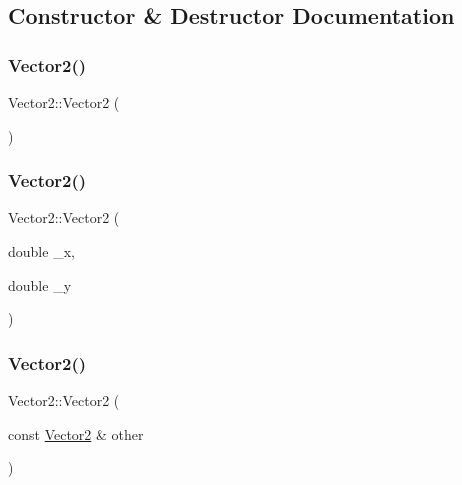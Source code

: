 \subsection{Constructor \& Destructor Documentation}
\mbox{\label{struct_vector2_a22104d1809be26a419ef1f959e3761bf}} 
\subsubsection{\texorpdfstring{Vector2()}{Vector2()}\hspace{0.1cm}{\footnotesize\ttfamily [1/3]}}
{\footnotesize\ttfamily Vector2\+::\+Vector2 (\begin{DoxyParamCaption}{ }\end{DoxyParamCaption})}

\mbox{\label{struct_vector2_a861062b13bd0e92d50b3ffd90c9edd77}} 
\subsubsection{\texorpdfstring{Vector2()}{Vector2()}\hspace{0.1cm}{\footnotesize\ttfamily [2/3]}}
{\footnotesize\ttfamily Vector2\+::\+Vector2 (\begin{DoxyParamCaption}\item[{double}]{\+\_\+x,  }\item[{double}]{\+\_\+y }\end{DoxyParamCaption})}

\mbox{\label{struct_vector2_ac0c70e89b089fb619dae62c32ccde4ec}} 
\subsubsection{\texorpdfstring{Vector2()}{Vector2()}\hspace{0.1cm}{\footnotesize\ttfamily [3/3]}}
{\footnotesize\ttfamily Vector2\+::\+Vector2 (\begin{DoxyParamCaption}\item[{const \mbox{\hyperlink{struct_vector2}{Vector2}} \&}]{other }\end{DoxyParamCaption})}



